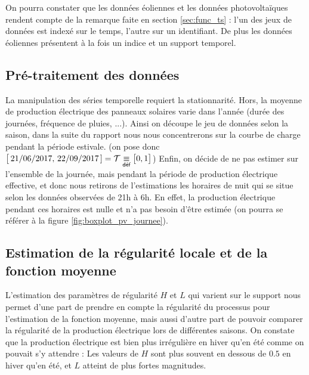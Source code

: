 \bigskip

\begin{rem}
	On pourra constater que les données éoliennes et les données photovoltaïques rendent compte de la remarque faite en section \ref{sec:func_ts} : l'un des jeux de données est indexé sur le temps, l'autre sur un identifiant. De plus les données éoliennes présentent à la fois un indice et un support temporel.
\end{rem}


\subsection{Pré-traitement des données}

La manipulation des séries temporelle requiert la stationnarité. Hors, la moyenne de production électrique des panneaux solaires varie dans l'année (durée des journées, fréquence de pluies, ...). Ainsi on découpe le jeu de données selon la saison, dans la suite du rapport nous nous concentrerons sur la courbe de charge pendant la période estivale. (on pose donc $\bigl[ \, 21/06/2017, \, 22/09/2017 \, ] = \mathcal T \isdef \bigl[ 0, 1 \bigr]$) Enfin, on décide de ne pas estimer sur l'ensemble de la journée, mais pendant la période de production électrique effective, et donc nous retirons de l'estimations les horaires de nuit qui se situe selon les données observées de 21h à 6h. En effet, la production électrique pendant ces horaires est nulle et n'a pas besoin d'être estimée (on pourra se référer à la figure \ref{fig:boxplot_pv_journee}).


\subsection{Estimation de la régularité locale et de la fonction moyenne}


L'estimation des paramètres de régularité $H$ et $L$  qui varient sur le support nous permet d'une part de prendre en compte la régularité du processus pour l'estimation de la fonction moyenne, mais aussi d'autre part de pouvoir comparer la régularité de la production électrique lors de différentes saisons.
On constate que la production électrique est bien plus irrégulière en hiver qu'en été comme on pouvait s'y attendre : Les valeurs de $H$ sont plus souvent en dessous de $0.5$ en hiver qu'en été, et $L$ atteint de plus fortes magnitudes.

